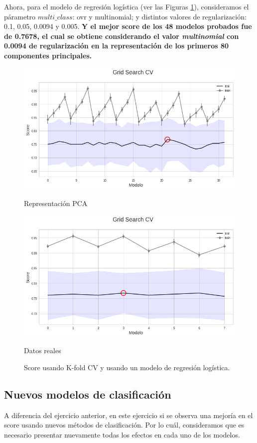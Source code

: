 \documentclass[paper=letter, fontsize=11pt]{scrartcl}
\numberwithin{equation}{section} %
\numberwithin{figure}{section} %
\numberwithin{table}{section} %
\begin{document}
Ahora, para el modelo de regresión logística (ver las Figuras \ref{s_reg}), consideramos el párametro $multi\_class$: ovr y multinomial; y distintos valores de regularización: 0.1, 0.05, 0.0094 y 0.005. \textbf{Y el mejor score de los 48 modelos probados fue de 0.7678, el cual se obtiene considerando el valor \textit{multinomial} con 0.0094 de regularización en la representación de los primeros 80 componentes principales.}

\begin{figure}[!htb]
  \includegraphics[width=\linewidth]{figure/s_reg_pca.png}\caption{Representación PCA}
\endminipage\hfill
{}
  \includegraphics[width=\linewidth]{figure/s_reg.png}
  \caption{Datos reales}
\endminipage
\caption{Score usando K-fold CV y usando un modelo de regresión logística.}\label{s_reg}
\end{figure}

\subsection*{Nuevos modelos de clasificación}
A diferencia del ejercicio anterior, en este ejercicio si se observa una mejoría en el score usando nuevos métodos de clasificación. Por lo cuál, consideramos que es necesario presentar nuevamente todas los efectos en cada uno de los modelos.\\
\end{document}
